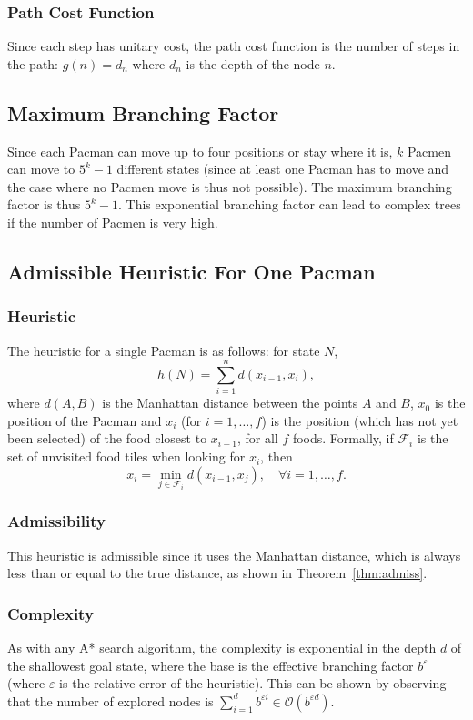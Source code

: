 \documentclass[journal]{IEEEtran}
\begin{document}
\subsubsection{Path Cost Function}
Since each step has unitary cost, the path cost function is the number of steps in the path: $g(n) = d_n$ where $d_n$ is the depth of the node $n$.


\subsection{Maximum Branching Factor}
Since each Pacman can move up to four positions or stay where it is, $k$ Pacmen can move to $5^k-1$ different states (since at least one Pacman has to move and the case where no Pacmen move is thus not possible).
The maximum branching factor is thus $5^k-1$.
This exponential branching factor can lead to complex trees if the number of Pacmen is very high.


\subsection{Admissible Heuristic For One Pacman}
\subsubsection{Heuristic}
The heuristic for a single Pacman is as follows: for state $N$,
\[
 h(N) = \sum_{i=1}^n d(x_{i-1},x_i),
\]
where $d(A,B)$ is the Manhattan distance between the points $A$ and $B$, $x_0$ is the position of the Pacman and $x_i$ (for \(i = 1, \ldots, f\)) is the position (which has not yet been selected) of the food closest to $x_{i-1}$, for all \(f\) foods.
Formally, if \(\mathscr{F}_i\) is the set of  unvisited food tiles when looking for \(x_i\), then
\[
x_{i} = \min_{j \in \mathscr{F}_i} d(x_{i-1}, x_j), \quad \forall i = 1, \ldots, f.
\]

\subsubsection{Admissibility}
This heuristic is admissible since it uses the Manhattan distance, which is always less than or equal to the true distance, as shown in Theorem~\ref{thm:admiss}.

\subsubsection{Complexity}
As with any A* search algorithm, the complexity is exponential in the depth \(d\) of the shallowest goal state, where the base is the effective branching factor \(b^\varepsilon\) (where \(\varepsilon\) is the relative error of the heuristic).
This can be shown by observing that the number of explored nodes is \(\sum_{i=1}^d b^{\varepsilon i} \in \mathcal{O}(b^{\varepsilon d})\).
\end{document}
